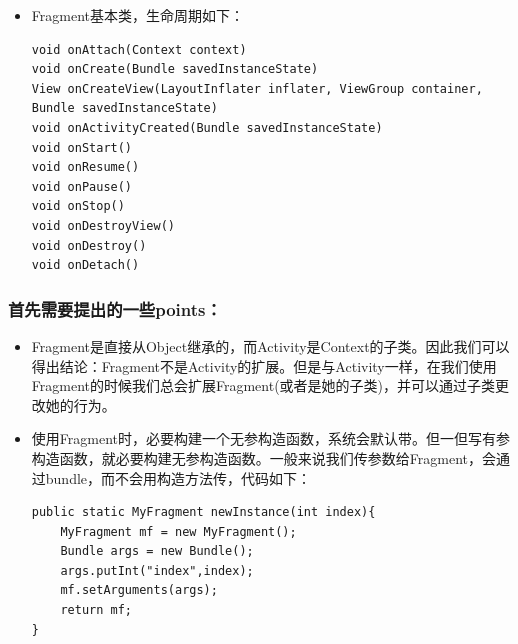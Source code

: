 \documentclass[9pt, b5paper]{article}
\begin{document}
\begin{itemize}
\item Fragment基本类，生命周期如下：
\begin{verbatim}
void onAttach(Context context)
void onCreate(Bundle savedInstanceState)
View onCreateView(LayoutInflater inflater, ViewGroup container, Bundle savedInstanceState)
void onActivityCreated(Bundle savedInstanceState)
void onStart()
void onResume()
void onPause()
void onStop()
void onDestroyView()
void onDestroy()
void onDetach()
\end{verbatim}
\end{itemize}

\subsubsection{首先需要提出的一些points：}
\label{sec-1-2-1}
\begin{itemize}
\item Fragment是直接从Object继承的，而Activity是Context的子类。因此我们可以得出结论：Fragment不是Activity的扩展。但是与Activity一样，在我们使用Fragment的时候我们总会扩展Fragment(或者是她的子类)，并可以通过子类更改她的行为。
\item 使用Fragment时，必要构建一个无参构造函数，系统会默认带。但一但写有参构造函数，就必要构建无参构造函数。一般来说我们传参数给Fragment，会通过bundle，而不会用构造方法传，代码如下：
\begin{verbatim}
public static MyFragment newInstance(int index){  
    MyFragment mf = new MyFragment();  
    Bundle args = new Bundle();  
    args.putInt("index",index);  
    mf.setArguments(args);  
    return mf;  
}
\end{verbatim}
\end{itemize}
\end{document}
